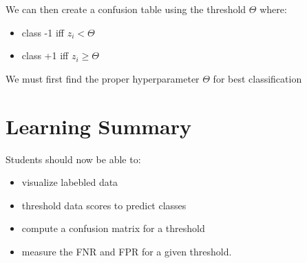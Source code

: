 \documentclass[12pt]{book}
\begin{document}
We can then create a confusion table using the threshold $\Theta$ where: 
\begin{itemize}
        \item class -1 iff $z_i < \Theta$
        \item class +1 iff $z_i \geq \Theta$
\end{itemize}

We must first find the proper hyperparameter $\Theta$ for best classification

\section*{Learning Summary}
Students should now be able to:
\begin{itemize}
        \item visualize labebled data
        \item threshold data scores to predict classes
        \item compute a confusion matrix for a threshold
        \item measure the FNR and FPR for a given threshold.
\end{itemize}
\end{document}
